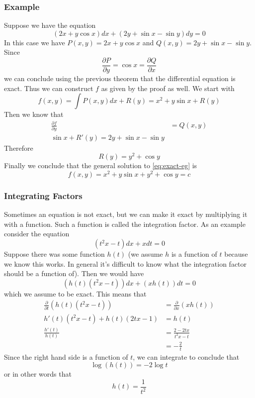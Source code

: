 \subsubsection{Example}
Suppose we have the equation
\begin{equation}\label{eq:exact-eg}
    (2x + y \cos x)dx + (2y + \sin x - \sin y)dy = 0
\end{equation}
In this case we have $P(x, y) = 2x + y \cos x$ and $Q(x, y) = 2y + \sin x - \sin y$. Since
$$ \frac{\partial P}{\partial y} = \cos x = \frac{\partial Q}{\partial x} $$
we can conclude using the previous theorem that the differential equation is exact. Thus we can construct $f$ as given by the proof as well. We start with
$$ f(x, y) = \int P(x, y) dx + R(y) = x^2 + y \sin x + R(y) $$
Then we know that
\begin{align*}
    \frac{\partial f}{\partial y} &= Q(x, y)\\
    \sin x + R'(y) = 2y + \sin x - \sin y
\end{align*}
Therefore
$$R(y) = y^2 + \cos y$$
Finally we conclude that the general solution to \autoref{eq:exact-eg} is 
$$ f(x, y) = x^2 + y \sin x + y^2 + \cos y = c $$

\subsubsection{Integrating Factors}
Sometimes an equation is not exact, but we can make it exact by multiplying it with a function. Such a function is called the integration factor. As an example consider the equation
\begin{equation}
    (t^2 x - t) dx + x dt = 0
\end{equation}
Suppose there was some function $h(t)$ (we assume $h$ is a function of $t$ because we know this works. In general it's difficult to know what the integration factor should be a function of). Then we would have
$$ (h(t)(t^2 x - t))dx + (x h(t)) dt = 0 $$
which we assume to be exact. This means that
\begin{align*}
    \frac{\partial }{\partial t} (h(t)(t^2 x - t)) &= \frac{\partial}{\partial x} (x h(t))\\
    h'(t) (t^2 x - t) + h(t) (2tx - 1) &= h(t)\\
    \frac{h'(t)}{h(t)} &= \frac{2 - 2tx}{t^2 x - t} \\
    &= -\frac{2}{t}
\end{align*}
Since the right hand side is a function of $t$, we can integrate to conclude that
$$ \log(h(t)) = -2 \log t $$
or in other words that
$$ h(t) = \frac{1}{t^2} $$

